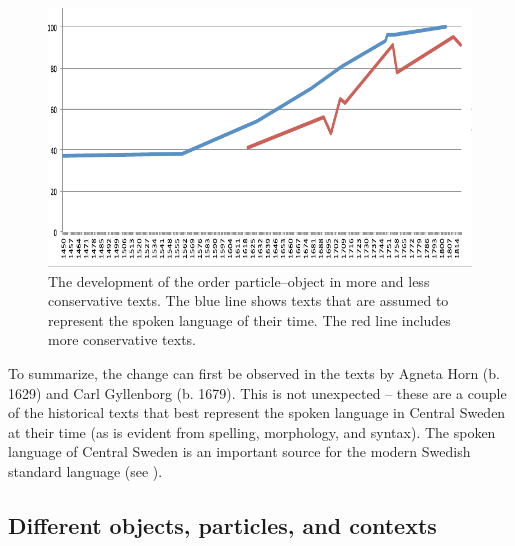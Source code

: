 \documentclass[output=paper]{langscibook}
\begin{document}
  
\begin{figure}
\includegraphics[width=\textwidth]{figures/a4-img002.pdf}
\caption{The development of the order particle–object in more and less conservative texts. The blue line shows texts that are assumed to represent the spoken language of their time. The red line includes more conservative texts.\label{fig:lalu:2}} 
\end{figure}


To summarize, the change can first be observed in the texts by Agneta Horn (b. 1629) and Carl Gyllenborg (b. 1679). This is not unexpected – these are a couple of the historical texts that best represent the spoken language in Central Sweden at their time (as is evident from spelling, morphology, and syntax). The spoken language of Central Sweden is an important source for the modern Swedish standard language (see ). 


\subsection{Different objects, particles, and contexts}\label{sec:lalu:5.2}
\end{document}

